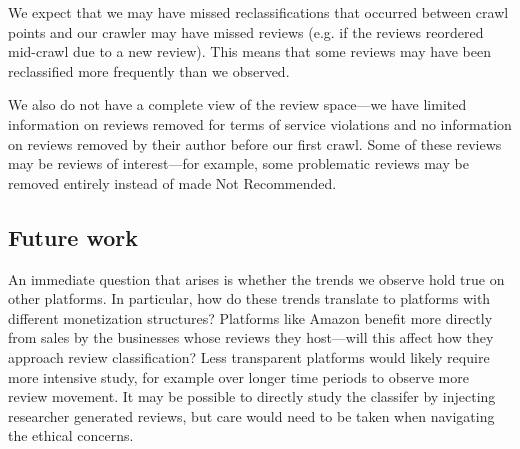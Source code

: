 
We expect that we may have missed reclassifications that occurred between crawl points and our crawler may have missed reviews (e.g. if the reviews reordered mid-crawl due to a new review). This means that some reviews may have been reclassified more frequently than we observed.

We also do not have a complete view of the review space---we have limited information on reviews removed for terms of service violations and no information on reviews removed by their author before our first crawl. Some of these reviews may be reviews of interest---for example, some problematic reviews may be removed entirely instead of made Not Recommended. %


\subsection{Future work} \label{subsec:conclusions}
An immediate question that arises is whether the trends we observe hold true on other platforms. In particular, how do these trends translate to platforms with different monetization structures? Platforms like Amazon benefit more directly from sales by the businesses whose reviews they host---will this affect how they approach review classification? Less transparent platforms would likely require more intensive study, for example over longer time periods to observe more review movement. It may be possible to directly study the classifer by injecting researcher generated reviews, but care would need to be taken when navigating the ethical concerns. %

